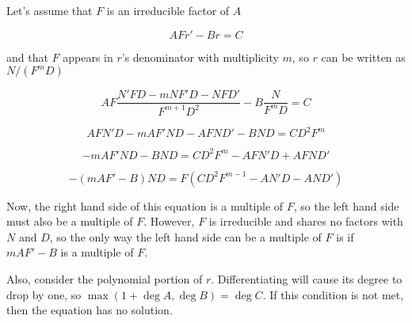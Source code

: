 \begin{comment}
$$A r' - \frac{B}{F} r = C$$

$$A F r' - B r = C F$$

$$A F \frac{N' F D - m N F' D - N F D'}{F^{m+1} D^2} - B \frac{N}{F^m D} = C F$$

$$A F N' D - m A F' N D - A F N D' - B N D = C D^2 F^{m+1}$$

$$ - m A F' N D - B N D  = C D^2 F^{m+1} - A F N' D + A F N D'$$

$$ - (m A F' - B ) N D  = F (C D^2 F^{m} - A N' D - A N D')$$
\end{comment}

\begin{comment}
$$A F^a r' - B F^b r = C F^c$$

$$A F^a \frac{N' F D - m N F' D - N F D'}{F^{m+1} D^2} - B F^b \frac{N}{F^m D} = C F^c$$

$$A F^{a+1} N' D - m A F^a F' N D - A F^{a+1} N D' - B F^{b+1} N D = C D^2 F^{c+m+1}$$

$$ - m A F^{a} F' N D - B F^{b+1} N D  = C D^2 F^{c+m+1} - A F^{a+1} N' D + A F^{a+1} N D'$$

\end{comment}

Let's assume that $F$ is an irreducible factor of $A$

$$A F r' - B r = C$$

and that $F$ appears in $r$'s denominator with multiplicity $m$,
so $r$ can be written as $N/(F^m D)$

$$A F \frac{N' F D - m N F' D - N F D'}{F^{m+1} D^2} - B \frac{N}{F^m D} = C$$

$$A F N' D - m A F' N D - A F N D' - B N D = C D^2 F^{m}$$

$$ - m A F' N D - B N D  = C D^2 F^{m} - A F N' D + A F N D'$$

$$ - (m A F' - B ) N D  = F (C D^2 F^{m-1} - A N' D - A N D')$$

Now, the right hand side of this equation is a multiple of $F$, so the
left hand side must also be a multiple of $F$.  However, $F$ is
irreducible and shares no factors with $N$ and $D$, so 
the only way the left hand side can be a multiple of $F$
is if $m A F' - B$ is a multiple of $F$.


Also, consider the polynomial portion of $r$.  Differentiating
will cause its degree to drop by one, so $\max(1 + \deg A, \deg B) = \deg C$.
If this condition is not met, then the equation has no solution.

